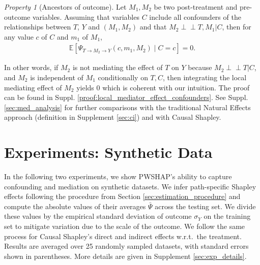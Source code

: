 \documentclass{article}
\theoremstyle{plain}
\theoremstyle{definition}
\theoremstyle{remark}
\newcommand{\effect}{\Psi}
\theoremstyle{mystyle}
\newtheorem{property}{Property}[section]
\newcommand{\indep}{\perp\!\!\!\!\perp}
\begin{document}
\begin{property}[Ancestors of outcome] \label{prop:local_mediator_effect_confounders} Let $M_1, M_2$ be two post-treatment and pre-outcome variables. %
Assuming that variables $C$ include all confounders of the relationships between $T$, $Y$ and $(M_1,M_2)$ and that $M_2 \indep T, M_1 | C$, then for any value $c$ of $C$ and $m_1$ of $M_1$,
\begin{align*}
\mathbb{E}[\effect_{T \rightarrow M_2 \rightarrow Y}(c,m_1,M_2) \mid C=c] = 0.
\end{align*}
\end{property}
In other words, if $M_2$ is not mediating the effect of $T$ on $Y$ because $M_2 \indep T | C$, and $M_2$ is independent of $M_1$ conditionally on $T, C$, then integrating the local mediating effect of $M_2$ yields 0 which is coherent with our intuition. The proof can be found in Suppl. \ref{proof:local_mediator_effect_confounders}. %
See Suppl. \ref{sec:med_analysis} for further comparisons with the traditional Natural Effects approach (definition in Supplement \ref{sec:ci}) and with Causal Shapley.%


\section{Experiments: Synthetic Data}
\label{sec:exp_synth}

In the following two experiments, we show PWSHAP's ability to capture confounding and mediation on synthetic datasets. We infer path-specific Shapley effects following the procedure from Section \ref{sec:estimation_procedure}  and compute the absolute values of their averages $\bar{\effect}$ across the testing set. We divide these values by the empirical standard deviation of outcome $\sigma_Y$ on the training set to mitigate variation due to the scale of the outcome. We follow the same process for Causal Shapley's direct and indirect effects w.r.t.~the treatment. Results are averaged over 25 randomly sampled datasets, with standard errors shown in parentheses. More details are given in Supplement \ref{sec:exp_details}.  %
\end{document}
